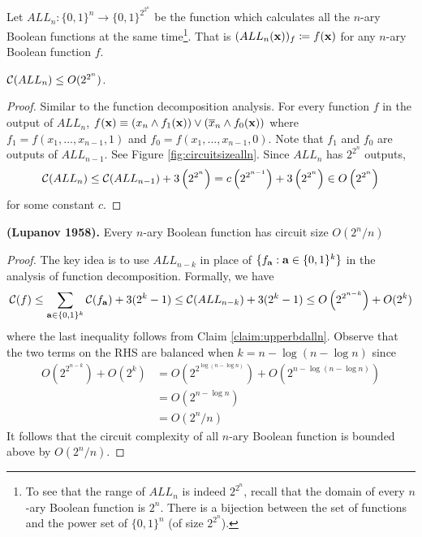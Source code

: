 \documentclass[11pt]{article}
\begin{document}
	Let $ALL_n: \{0,1\}^n \rightarrow \{0,1\}^{2^{2^{n}}}$ be the function which calculates all the $n$-ary Boolean functions at the same time\footnote{To see that the range of $ALL_n$ is indeed $2^{2^{n}}$, recall that the domain of every $n$-ary Boolean function is $2^{n}$. There is a bijection between the set of functions and the power set of $\{0,1\}^n$ (of size $2^{2^{n}}$).}. That is $(ALL_n(\mathbf{x}))_f \coloneqq f(\mathbf{x})$ for any $n$-ary Boolean function $f$.
	
	\begin{claim}
		\label{claim:upperbdalln}
		$\mathcal{C}(ALL_n) \leq O(2^{2^{n}})$.
	\end{claim}
	\begin{proof}
		Similar to the function decomposition analysis. For every function $f$ in the output of $ALL_n$, $f(\mathbf{x}) \equiv \left(x_n \land f_{1}(\mathbf{x})\right) \lor \left(\overline{x}_n \land f_{0}(\mathbf{x})\right)$ where $f_1 = f(x_1, ..., x_{n-1}, 1)$ and $f_0 = f(x_1, ..., x_{n-1}, 0)$. Note that $f_1$ and $f_0$ are outputs of $ALL_{n-1}$. See Figure \ref{fig:circuitsizealln}. Since $ALL_n$ has $2^{2^{n}}$ outputs,
		\[\mathcal{C}(ALL_n) \leq \mathcal{C}(ALL_{n-1}) + 3\left(2^{2^{n}}\right) = c\left(2^{2^{n-1}}\right) + 3\left(2^{2^{n}}\right) \in O\left(2^{2^{n}}\right)\]
		for some constant $c$. 
	\end{proof}
	
	\begin{theorem}
		\label{thm:lupanov1958-circuitsizeupperbd}
		\textbf{(Lupanov 1958).} Every $n$-ary Boolean function has circuit size $O(2^n/n)$
	\end{theorem}
	\begin{proof}
		The key idea is to use $ALL_{n-k}$ in place of $\{f_{\mathbf{a}}: \mathbf{a} \in \{0,1\}^k\}$ in the analysis of function decomposition. Formally, we have 
		\[\mathcal{C}(f) \leq \sum_{\mathbf{a} \in \{0,1\}^k}\mathcal{C}(f_{\mathbf{a}}) + 3(2^k - 1) \leq \mathcal{C}(ALL_{n-k}) + 3(2^k - 1) \leq O\left(2^{2^{n-k}}\right) + O(2^k)\]
		where the last inequality follows from Claim \ref{claim:upperbdalln}. Observe that the two terms on the RHS are balanced when $k = n - \log(n - \log n)$ since
		\begin{align*}
			O\left(2^{2^{n-k}}\right) + O\left(2^k\right) &= O\left(2^{2^{\log(n - \log n)}}\right) + O\left(2^{n - \log(n - \log n)}\right)\\
			&= O\left(2^{n - \log n}\right)\\
			&= O\left(2^n/n\right)
		\end{align*}
		It follows that the circuit complexity of all $n$-ary Boolean function is bounded above by $O(2^n/n)$.
	\end{proof}
	
\end{document}
